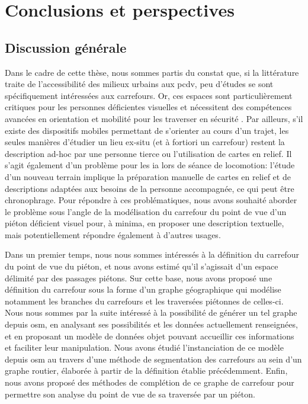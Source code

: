 \chapter{Conclusions et perspectives}
\label{chap:conclusion}

\section{Discussion générale}

Dans le cadre de cette thèse, nous sommes partis du constat que, si la littérature traite de l'accessibilité des milieux urbains aux \gls{pcdv}, peu d'études se sont spécifiquement intéressées aux carrefours. Or, ces espaces sont particulièrement critiques pour les personnes déficientes visuelles et nécessitent des compétences avancées en orientation et mobilité pour les traverser en sécurité \cite{ratelle_manuel_2019}. Par ailleurs, s'il existe des dispositifs mobiles permettant de s'orienter au cours d'un trajet, les seules manières d'étudier un lieu ex-situ (et à fortiori un carrefour) restent la description ad-hoc par une personne tierce ou l'utilisation de cartes en relief. Il s'agit également d'un problème pour les \gls{ia} lors de séance de locomotion: l'étude d'un nouveau terrain implique la préparation manuelle de cartes en relief et de descriptions adaptées aux besoins de la personne accompagnée, ce qui peut être chronophrage. Pour répondre à ces problématiques, nous avons souhaité aborder le problème sous l'angle de la modélisation du carrefour du point de vue d'un piéton déficient visuel pour, à minima, en proposer une description textuelle, mais potentiellement répondre également à d'autres usages.

\newpar{}


Dans un premier temps, nous nous sommes intéressés à la définition du carrefour du point de vue du piéton, et nous avons estimé qu'il s'agissait d'un espace délimité par des passages piétons. Sur cette base, nous avons proposé une définition du carrefour sous la forme d'un graphe géographique qui modélise notamment les branches du carrefours et les traversées piétonnes de celles-ci. Nous nous sommes par la suite intéressé à la possibilité de générer un tel graphe depuis \gls{osm}, en analysant ses possibilités et les données actuellement renseignées, et en proposant un modèle de données objet pouvant accueillir ces informations et faciliter leur manipulation. Nous avons étudié l'instanciation de ce modèle depuis \gls{osm} au travers d'une méthode de segmentation des carrefours au sein d'un graphe routier, élaborée à partir de la définition établie précédemment. Enfin, nous avons proposé des méthodes de complétion de ce graphe de carrefour pour permettre son analyse du point de vue de sa traversée par un piéton.

